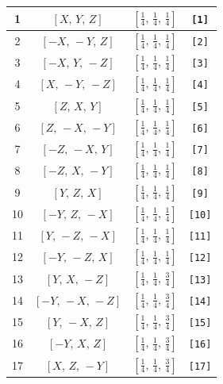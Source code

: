 \documentclass[fleqn,8pt]{jsarticle}
\begin{document}
\begin{longtable}{cccc}
1 & $\left[ X,\, Y,\, Z \right]$ & $\left[ \frac{1}{4},\, \frac{1}{4},\, \frac{1}{4} \right]$ & {\tt [1]} \\ \hline
2 & $\left[ - X,\, - Y,\, Z \right]$ & $\left[ \frac{1}{4},\, \frac{1}{4},\, \frac{1}{4} \right]$ & {\tt [2]} \\ \hline
3 & $\left[ - X,\, Y,\, - Z \right]$ & $\left[ \frac{1}{4},\, \frac{1}{4},\, \frac{1}{4} \right]$ & {\tt [3]} \\ \hline
4 & $\left[ X,\, - Y,\, - Z \right]$ & $\left[ \frac{1}{4},\, \frac{1}{4},\, \frac{1}{4} \right]$ & {\tt [4]} \\ \hline
5 & $\left[ Z,\, X,\, Y \right]$ & $\left[ \frac{1}{4},\, \frac{1}{4},\, \frac{1}{4} \right]$ & {\tt [5]} \\ \hline
6 & $\left[ Z,\, - X,\, - Y \right]$ & $\left[ \frac{1}{4},\, \frac{1}{4},\, \frac{1}{4} \right]$ & {\tt [6]} \\ \hline
7 & $\left[ - Z,\, - X,\, Y \right]$ & $\left[ \frac{1}{4},\, \frac{1}{4},\, \frac{1}{4} \right]$ & {\tt [7]} \\ \hline
8 & $\left[ - Z,\, X,\, - Y \right]$ & $\left[ \frac{1}{4},\, \frac{1}{4},\, \frac{1}{4} \right]$ & {\tt [8]} \\ \hline
9 & $\left[ Y,\, Z,\, X \right]$ & $\left[ \frac{1}{4},\, \frac{1}{4},\, \frac{1}{4} \right]$ & {\tt [9]} \\ \hline
10 & $\left[ - Y,\, Z,\, - X \right]$ & $\left[ \frac{1}{4},\, \frac{1}{4},\, \frac{1}{4} \right]$ & {\tt [10]} \\ \hline
11 & $\left[ Y,\, - Z,\, - X \right]$ & $\left[ \frac{1}{4},\, \frac{1}{4},\, \frac{1}{4} \right]$ & {\tt [11]} \\ \hline
12 & $\left[ - Y,\, - Z,\, X \right]$ & $\left[ \frac{1}{4},\, \frac{1}{4},\, \frac{1}{4} \right]$ & {\tt [12]} \\ \hline
13 & $\left[ Y,\, X,\, - Z \right]$ & $\left[ \frac{1}{4},\, \frac{1}{4},\, \frac{3}{4} \right]$ & {\tt [13]} \\ \hline
14 & $\left[ - Y,\, - X,\, - Z \right]$ & $\left[ \frac{1}{4},\, \frac{1}{4},\, \frac{3}{4} \right]$ & {\tt [14]} \\ \hline
15 & $\left[ Y,\, - X,\, Z \right]$ & $\left[ \frac{1}{4},\, \frac{1}{4},\, \frac{3}{4} \right]$ & {\tt [15]} \\ \hline
16 & $\left[ - Y,\, X,\, Z \right]$ & $\left[ \frac{1}{4},\, \frac{1}{4},\, \frac{3}{4} \right]$ & {\tt [16]} \\ \hline
17 & $\left[ X,\, Z,\, - Y \right]$ & $\left[ \frac{1}{4},\, \frac{1}{4},\, \frac{3}{4} \right]$ & {\tt [17]} \\ \hline

\end{longtable}
\end{document}
